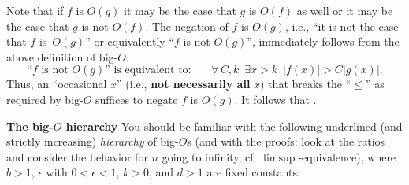 \documentclass[titlepage]{article}
\theoremstyle{definition}
\numberwithin{equation}{subsection}
\numberwithin{remark}{subsection}
\begin{document}
Note that if $f$ is $O(g)$ it may be the case that $g$ is $O(f)$ as well or it may be the case that $g$ is not $O(f)$.
The negation of $f$ is $O(g)$, i.e., ``it is not the case that $f$ is~$O(g)$'' or equivalently ``$f$ is not $O(g)$'', immediately follows from the above definition of big-$O$:
$$\text{``}f\text{ is not }O(g)\text{'' is equivalent to: }\,\,\,\,\,\,\,\,\,\forall\, C, k\,\,\,\exists x>k\,\,\,|f(x)|> C|g(x)|.$$
Thus, an ``occasional $x$'' (i.e., {\bf not necessarily all} $x$) that breaks the ``$\le$'' as required by big-$O$ suffices to negate $f$ is $O(g)$.
It follows that {}.\\
\par\noindent
{\bf{The big-$O$ hierarchy}}
You should be familiar with the following underlined (and strictly increasing) \emph{hierarchy} of big-$O$s (and with the proofs: look at the ratios and consider the behavior for $n$ going to infinity, cf. $\limsup$-equivalence), where $b>1$, $\epsilon$ with $0<\epsilon<1$, $k>0$, and $d>1$ are fixed constants:
\end{document}
